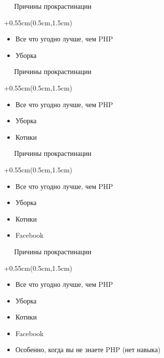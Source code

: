 \documentclass[xetex,18pt,aspectratio=169]{beamer}
\begin{document}
\begin{Large}
\begin{frame}{\ \ \ Причины прокрастинации}
\begin{textblock*}{\framewidth+0.55cm}(0.5cm,1.5cm)
\begin{itemize}
  \item Все что угодно лучше, чем PHP
  \item Уборка
\end{itemize}
\end{textblock*}
\end{frame}

\begin{frame}{\ \ \ Причины прокрастинации}
\begin{textblock*}{\framewidth+0.55cm}(0.5cm,1.5cm)
\begin{itemize}
  \item Все что угодно лучше, чем PHP
  \item Уборка
  \item Котики
\end{itemize}
\end{textblock*}
\end{frame}

\begin{frame}{\ \ \ Причины прокрастинации}
\begin{textblock*}{\framewidth+0.55cm}(0.5cm,1.5cm)
\begin{itemize}
  \item Все что угодно лучше, чем PHP
  \item Уборка
  \item Котики
  \item Facebook
\end{itemize}
\end{textblock*}
\end{frame}

\begin{frame}{\ \ \ Причины прокрастинации}
\begin{textblock*}{\framewidth+0.55cm}(0.5cm,1.5cm)
\begin{itemize}
  \item Все что угодно лучше, чем PHP
  \item Уборка
  \item Котики
  \item Facebook
  \item Особенно, когда вы не знаете PHP (нет навыка)
\end{itemize}
\end{textblock*}
\end{frame}


\end{Large}
\end{document}

